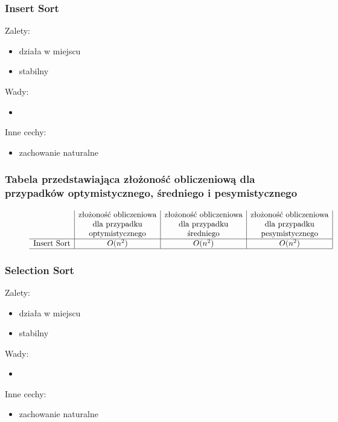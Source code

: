 \documentclass[polish,polish,a4paper]{article}
\begin{document}
\begin{spacing}{1.5}
	\subsubsection*{Insert Sort}
	Zalety:
	\begin{itemize}
		\item działa w miejscu
		\item stabilny 
	\end{itemize}
	Wady:
	\begin{itemize}
		\item 
	\end{itemize}
	Inne cechy:
	\begin{itemize}
		\item zachowanie naturalne
	\end{itemize}
	
				\subsubsection*{Tabela przedstawiająca złożoność obliczeniową dla przypadków optymistycznego, średniego i pesymistycznego} 
	
	\begin{figure}[H]
		\begin{equation*}
		\begin{array}{l|c|c|c|}

		&$złożoność obliczeniowa$&$złożoność obliczeniowa$&$złożoność obliczeniowa$\\
		&$dla przypadku$&$dla przypadku$&$dla przypadku$\\
		&$optymistycznego$&$średniego$&$pesymistycznego$\\
		\hline
		$Insert Sort$&O(n^2)&O(n^2)&O(n^2)\\
		\hline
		\end{array}
		\end{equation*}
	\end{figure}
		
		\subsubsection*{Selection Sort}
	Zalety:
	\begin{itemize}
		\item działa w miejscu
		\item stabilny 
	\end{itemize}
	Wady:
	\begin{itemize}
		\item 
	\end{itemize}
	Inne cechy:
	\begin{itemize}
		\item zachowanie naturalne
	\end{itemize}
	

\end{spacing}
\end{document}
